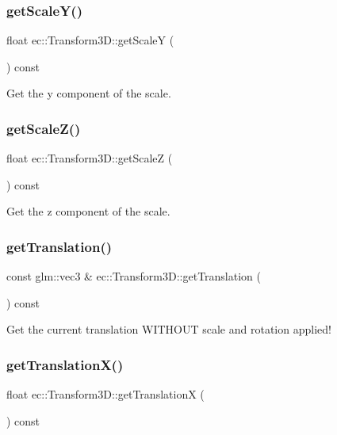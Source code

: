 \subsubsection{\texorpdfstring{get\+Scale\+Y()}{getScaleY()}}
{\footnotesize\ttfamily float ec\+::\+Transform3\+D\+::get\+ScaleY (\begin{DoxyParamCaption}{ }\end{DoxyParamCaption}) const}

Get the y component of the scale. \mbox{\label{classec_1_1_transform3_d_ad79cc7092172c384e46b426059928672}} 
\subsubsection{\texorpdfstring{get\+Scale\+Z()}{getScaleZ()}}
{\footnotesize\ttfamily float ec\+::\+Transform3\+D\+::get\+ScaleZ (\begin{DoxyParamCaption}{ }\end{DoxyParamCaption}) const}

Get the z component of the scale. \mbox{\label{classec_1_1_transform3_d_a73b5f3bfbeb73eb4f445b1941b8e359d}} 
\subsubsection{\texorpdfstring{get\+Translation()}{getTranslation()}}
{\footnotesize\ttfamily const glm\+::vec3 \& ec\+::\+Transform3\+D\+::get\+Translation (\begin{DoxyParamCaption}{ }\end{DoxyParamCaption}) const}

Get the current translation W\+I\+T\+H\+O\+UT scale and rotation applied! \mbox{\label{classec_1_1_transform3_d_ac0371b75ed67d59665967846d9cc6827}} 
\subsubsection{\texorpdfstring{get\+Translation\+X()}{getTranslationX()}}
{\footnotesize\ttfamily float ec\+::\+Transform3\+D\+::get\+TranslationX (\begin{DoxyParamCaption}{ }\end{DoxyParamCaption}) const}


